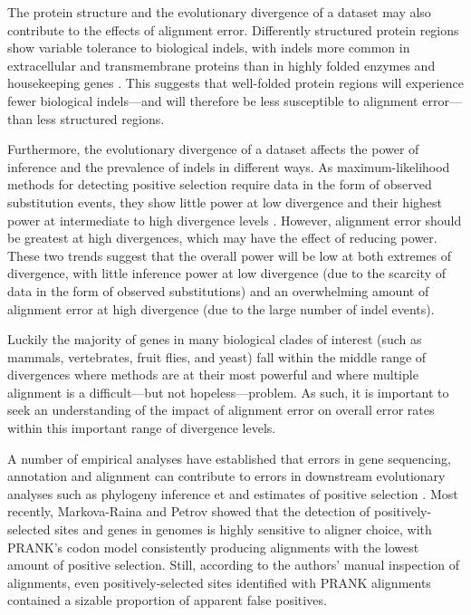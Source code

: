 \documentclass{article}
\begin{document}


The protein structure and the evolutionary divergence of a dataset may
also contribute to the effects of alignment error. Differently
structured protein regions show variable tolerance to biological
indels, with indels more common in extracellular and transmembrane
proteins than in highly folded enzymes and housekeeping genes
\citep{delaChaux2007DNA} . This suggests that well-folded protein
regions will experience fewer biological indels---and will therefore
be less susceptible to alignment error---than less structured
regions.

Furthermore, the evolutionary divergence of a dataset affects the
power of \sw inference and the prevalence of indels in different
ways. As maximum-likelihood methods for detecting positive selection
require data in the form of observed substitution events, they show
little power at low divergence and their highest power at intermediate
to high divergence levels \citep{Anisimova2001Accuracy}. However,
alignment error should be greatest at high divergences, which may have
the effect of reducing power. These two trends suggest that the
overall power will be low at both extremes of divergence, with little
inference power at low divergence (due to the scarcity of data in the
form of observed substitutions) and an overwhelming amount of
alignment error at high divergence (due to the large number of indel
events).

Luckily the majority of genes in many biological clades of interest
(such as mammals, vertebrates, fruit flies, and yeast) fall within the
middle range of divergences where \sw methods are at their most
powerful and where multiple alignment is a difficult---but not
hopeless---problem. As such, it is important to seek an understanding
of the impact of alignment error on overall error rates within this
important range of divergence levels.

A number of empirical analyses have established that errors in gene
sequencing, annotation and alignment can contribute to errors in
downstream evolutionary analyses such as phylogeny inference
\citep{Wong2008Alignment} et and estimates of positive selection
\citep{Schneider2009Estimates,Markova-Raina2011High} . Most recently,
Markova-Raina and Petrov \citeyearpar{Markova-Raina2011High} showed
that the detection of positively-selected sites and genes in \Dr
genomes is highly sensitive to aligner choice, with PRANK's codon
model consistently producing alignments with the lowest amount of
positive selection. Still, according to the authors' manual inspection
of alignments, even positively-selected sites identified with PRANK
alignments contained a sizable proportion of apparent false positives.
\end{document}
